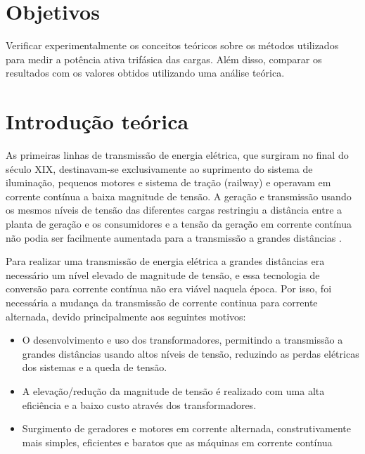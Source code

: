 \documentclass[a4paper,12pt,oneside,openany,table,xcdraw]{article}
\begin{document}
\newcommand{\thedepartment}{Faculdade de Engenharia Elétrica}
\newcommand{\thecourse}{FEELT}
\newcommand{\thetitle}{CIRCUITOS TRIFÁSICOS EQUILIBRADOS - MEDIDA DE POTÊNCIA COM 2 WATTÍMETROS }
\newcommand{\thetype}{Relatório da Disciplina de Experimental de Circuitos Elétricos II}
\newcommand{\theproftitle}{Bacharel em Engenharia Elétrica}
\newcommand{\thestudent}{Lesly Viviane Montúfar Berrios\\
\centering11811ETE001}
\newcommand{\theadvisor}{Prof. Wellington Maycon Santos Bernardes}
\newcommand{\thecity}{Uberlândia}

\thispagestyle{empty}


\onehalfspacing
\tableofcontents %
\newpage

\section{Objetivos} %
 Verificar experimentalmente os conceitos teóricos sobre os métodos utilizados para medir a potência ativa trifásica das cargas. Além disso, comparar os resultados com os valores obtidos utilizando uma análise teórica. 

\section{Introdução teórica} %
As primeiras linhas de transmissão de energia elétrica, que surgiram no final do século XIX, destinavam-se exclusivamente ao suprimento do sistema de iluminação, pequenos motores e sistema de tração (railway) e operavam em corrente contínua a baixa magnitude de tensão. A geração e transmissão usando os mesmos níveis de tensão das diferentes cargas restringiu a distância entre a planta de geração e os consumidores e a tensão da geração em corrente contínua não podia ser facilmente aumentada para a transmissão a grandes distâncias \cite{ph}. 

Para realizar uma transmissão de energia elétrica a grandes distâncias era necessário um nível elevado de magnitude de tensão, e essa tecnologia de conversão para corrente contínua não era viável naquela época. Por isso, foi necessária a mudança da transmissão de corrente continua para corrente alternada, devido principalmente aos seguintes motivos:

\begin{itemize}
\item O desenvolvimento e uso dos transformadores, permitindo a transmissão a grandes distâncias usando altos níveis de tensão, reduzindo as perdas elétricas dos sistemas e a queda de tensão.
\item A elevação/redução da magnitude de tensão é realizado com uma alta eficiência e a baixo custo através dos transformadores.
\item Surgimento de geradores e motores em corrente alternada, construtivamente mais simples, eficientes e baratos que as máquinas em corrente contínua
\end{itemize}
\end{document}
